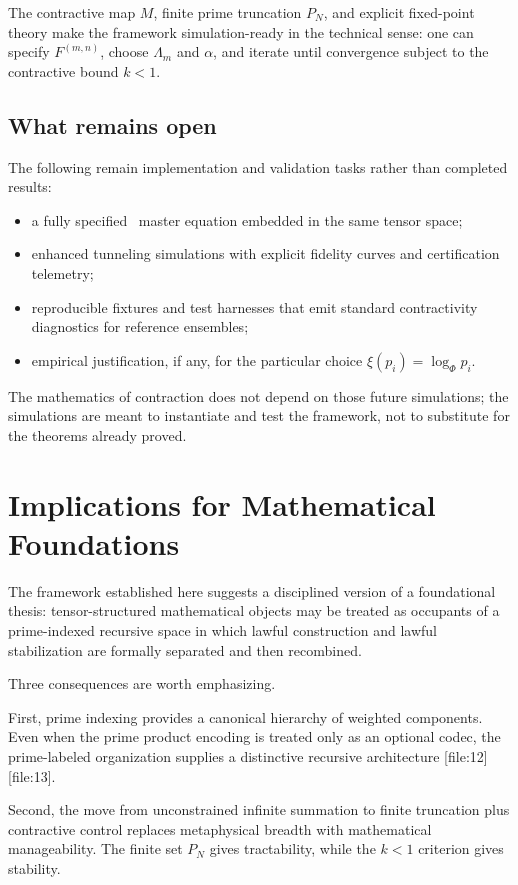 \documentclass[11pt,a4paper]{article}
\newcommand{\ZRSD}{\mathrm{ZRSD}}
\begin{document}
The contractive map \(M\), finite prime truncation \(P_N\), and explicit fixed-point theory make the framework simulation-ready in the technical sense: one can specify \(F^{(m,n)}\), choose \(\Lambda_m\) and \(\alpha\), and iterate until convergence subject to the contractive bound \(k<1\).

\subsection{What remains open}

The following remain implementation and validation tasks rather than completed results:

\begin{itemize}[leftmargin=2em]
\item a fully specified \ZRSD\ master equation embedded in the same tensor space;
\item enhanced tunneling simulations with explicit fidelity curves and certification telemetry;
\item reproducible fixtures and test harnesses that emit standard contractivity diagnostics for reference ensembles;
\item empirical justification, if any, for the particular choice \(\xi(p_i)=\log_\Phi p_i\).
\end{itemize}

The mathematics of contraction does not depend on those future simulations; the simulations are meant to instantiate and test the framework, not to substitute for the theorems already proved.

\section{Implications for Mathematical Foundations}

The framework established here suggests a disciplined version of a foundational thesis: tensor-structured mathematical objects may be treated as occupants of a prime-indexed recursive space in which lawful construction and lawful stabilization are formally separated and then recombined.

Three consequences are worth emphasizing.

First, prime indexing provides a canonical hierarchy of weighted components. Even when the prime product encoding is treated only as an optional codec, the prime-labeled organization supplies a distinctive recursive architecture [file:12][file:13].

Second, the move from unconstrained infinite summation to finite truncation plus contractive control replaces metaphysical breadth with mathematical manageability. The finite set \(P_N\) gives tractability, while the \(k<1\) criterion gives stability.
\end{document}
